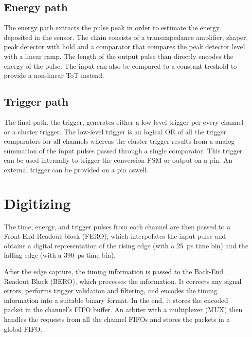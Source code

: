\subsection{Energy path}
The energy path extracts the pulse peak in order to estimate the energy deposited in the sensor. The chain consists of a transimpedance amplifier, shaper, peak detector with hold and a comparator that compares the peak detector level with a linear ramp. The length of the output pulse than directly encodes the energy of the pulse. The input can also be compared to a constant treshold to provide a non-linear ToT instead. 

\subsection{Trigger path}
The final path, the trigger, generates either a low-level trigger per every channel or a cluster trigger. The low-level trigger is an logical OR of all the trigger comparators for all channels whereas the cluster trigger results from a analog summation of the input pulses passed through a single comparator. This trigger can be used internally to trigger the conversion FSM or output on a pin. An external trigger can be provided on a pin aswell.



\section{Digitizing}
\label{sec:fastic_digitizing}
The time, energy, and trigger pulses from each channel are then passed to a Front-End Readout block (FERO), which interpolates the input pulse and obtains a digital representation of the rising edge (with a \SI{25}{\pico\second} time bin) and the falling edge (with a \SI{390}{\pico\second} time bin).

After the edge capture, the timing information is passed to the Back-End Readout Block (BERO), which processes the information. It corrects any signal errors, performs trigger validation and filtering, and encodes the timing information into a suitable binary format. In the end, it stores the encoded packet in the channel's FIFO buffer. An arbiter with a multiplexer (MUX) then handles the requests from all the channel FIFOs and stores the packets in a global FIFO.

